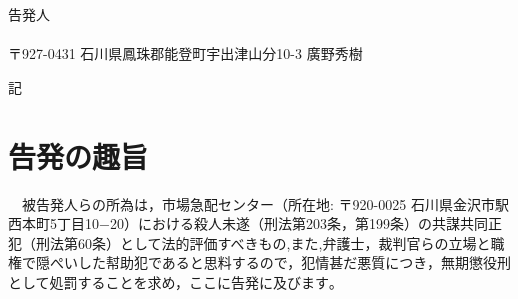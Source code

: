 \documentclass[
]{ltjarticle}
\begin{document}
\fontsize{11pt}{11pt}\selectfont
告発人\\
\\
〒927-0431 石川県鳳珠郡能登町宇出津山分10-3 \hspace{60mm}廣野秀樹

\vspace{16mm}
\begin{center}
記
\par\end{center}
\vspace{16mm}

\section{告発の趣旨}
　被告発人らの所為は，市場急配センター（所在地: 〒920-0025 石川県金沢市駅西本町5丁目10−20）における殺人未遂（刑法第203条，第199条）の共謀共同正犯（刑法第60条）として法的評価すべきもの,また,弁護士，裁判官らの立場と職権で隠ぺいした幇助犯であると思料するので，犯情甚だ悪質につき，無期懲役刑として処罰することを求め，ここに告発に及びます｡
\clearpage
\end{document}
